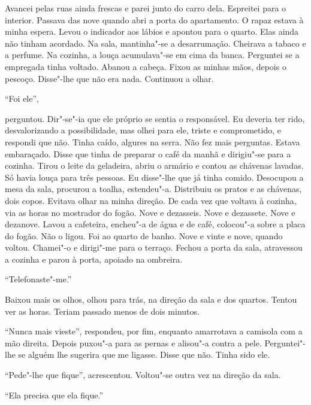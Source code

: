 Avancei pelas ruas ainda frescas e parei junto do carro dela. Espreitei
para o interior. Passava das nove quando abri a porta do apartamento. O
rapaz estava à minha espera. Levou o indicador aos lábios e apontou para
o quarto. Elas ainda não tinham acordado. Na sala, mantinha"-se a
desarrumação. Cheirava a tabaco e a perfume. Na cozinha, a louça
acumulava"-se em cima da banca. Perguntei se a empregada tinha voltado.
Abanou a cabeça. Fixou as minhas mãos, depois o pescoço. Disse"-lhe que
não era nada. Continuou a olhar.

``Foi ele'',

perguntou. Dir"-se"-ia que ele próprio se sentia o responsável. Eu
deveria ter rido, desvalorizando a possibilidade, mas olhei para ele,
triste e comprometido, e respondi que não. Tinha caído, algures na
serra. Não fez mais perguntas. Estava embaraçado. Disse que tinha de
preparar o café da manhã e dirigiu"-se para a cozinha. Tirou o leite
da geladeira, abriu o armário e contou as chávenas lavadas. Só havia
louça para três pessoas. Eu disse"-lhe que já tinha comido. Desocupou a
mesa da sala, procurou a toalha, estendeu"-a. Distribuiu os pratos e as
chávenas, dois copos. Evitava olhar na minha direção. De cada vez que
voltava à cozinha, via as horas no mostrador do fogão. Nove e dezasseis.
Nove e dezassete. Nove e dezanove. Lavou a cafeteira, encheu"-a de água
e de café, colocou"-a sobre a placa do fogão. Não o ligou. Foi ao quarto
de banho. Nove e vinte e nove, quando voltou. Chamei"-o e dirigi"-me
para o terraço. Fechou a porta da sala, atravessou a cozinha e parou à
porta, apoiado na ombreira.

``Telefonaste"-me.''

Baixou mais os olhos, olhou para trás, na direção da sala e dos
quartos. Tentou ver as horas. Teriam passado menos de dois minutos.

``Nunca mais vieste'',
respondeu, por fim, enquanto amarrotava a camisola com a mão direita.
Depois puxou"-a para as pernas e alisou"-a contra a pele. Perguntei"-lhe
se alguém lhe sugerira que me ligasse. Disse que não. Tinha sido ele.

``Pede"-lhe que fique'',
acrescentou. Voltou"-se outra vez na direção da sala.

``Ela precisa que ela fique.''


